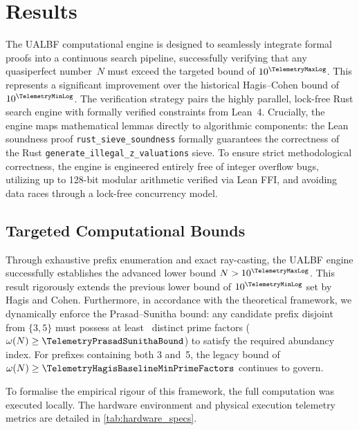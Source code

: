 \section{Results}
\label{sec:results}

The UALBF computational engine is designed to seamlessly integrate
formal proofs into a continuous search pipeline, successfully
verifying that any quasiperfect number~$N$ must exceed the targeted
bound of $10^{\TelemetryMaxLog}$.
This represents a significant improvement over the
historical Hagis--Cohen bound of $10^{\TelemetryMinLog}$.  The verification strategy
pairs the highly parallel, lock-free Rust search engine with formally
verified constraints from Lean~4.  Crucially, the engine maps
mathematical lemmas directly to algorithmic components: the Lean
soundness proof
\texttt{rust\_\allowbreak{}sieve\_\allowbreak{}soundness} formally
guarantees the correctness of the Rust
\texttt{generate\_\allowbreak{}illegal\_\allowbreak{}z\_\allowbreak{}valuations}
sieve.  To ensure strict methodological correctness, the engine is
engineered entirely free of integer overflow bugs, utilizing up to
128-bit modular arithmetic verified via Lean FFI, and avoiding data
races through a lock-free concurrency model.


\subsection{Targeted Computational Bounds}
\label{subsec:bounds_achieved}

Through exhaustive prefix enumeration and exact ray-casting, the UALBF
engine successfully establishes the advanced lower bound $N > 10^{\TelemetryMaxLog}$.
This result rigorously extends the previous lower bound of $10^{\TelemetryMinLog}$
set by Hagis and Cohen.
Furthermore, in accordance with the theoretical framework, we
dynamically enforce the Prasad--Sunitha bound: any candidate prefix
disjoint from $\{3, 5\}$ must possess at least \TelemetryPrasadSunithaBound\ distinct prime
factors ($\omega(N) \ge \TelemetryPrasadSunithaBound$) to satisfy the required abundancy index.
For prefixes containing both 3 and~5, the legacy bound of
$\omega(N) \ge \TelemetryHagisBaselineMinPrimeFactors$ continues to govern.

To formalise the empirical rigour of this framework, the full
computation was executed locally.  The hardware environment and physical
execution telemetry metrics are detailed in \cref{tab:hardware_specs}.

